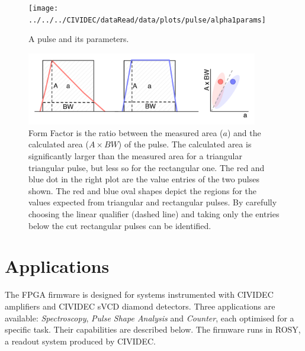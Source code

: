 \begin{figure}[!t]
\centering
\texttt{[image: ../../../CIVIDEC/dataRead/data/plots/pulse/alpha1params]}
\caption{A pulse and its parameters.}
\label{fig:params}
\end{figure}


\begin{figure}[!t]
\centering
\includegraphics[width=0.9\textwidth]{05_current_monitoring/plots/formfac1}
\caption{Form Factor is the ratio between the measured area ($a$) and the calculated area ($A\times BW$) of the pulse. The calculated area is significantly larger than the measured area for a triangular triangular pulse, but less so for the rectangular one. The red and blue dot in the right plot are the value entries of the two pulses shown. The red and blue oval shapes depict the regions for the values expected from triangular and rectangular pulses. By carefully choosing the linear qualifier (dashed line) and taking only the entries below the cut rectangular pulses can be identified.}
\label{fig:formfac1}
\end{figure}



\section{Applications}
\label{sec:applications}

The FPGA firmware is designed for systems instrumented with CIVIDEC amplifiers and CIVIDEC sVCD diamond detectors. Three applications are available: \emph{Spectroscopy}, \emph{Pulse Shape Analysis} and \emph{Counter}, each optimised for a specific task. Their capabilities are described below. The firmware runs in ROSY, a readout system produced by CIVIDEC.

